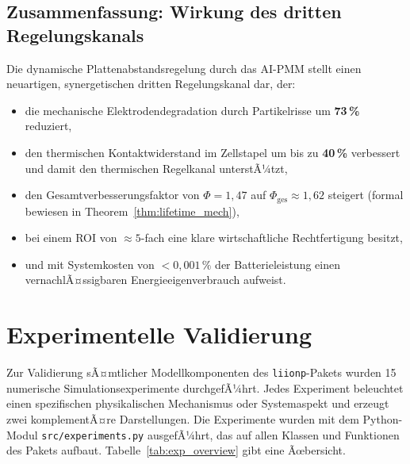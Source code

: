 ﻿\documentclass[12pt,a4paper]{article}
\begin{document}
\subsection{Zusammenfassung: Wirkung des dritten Regelungskanals}

Die dynamische Plattenabstandsregelung durch das AI-PMM stellt einen
neuartigen, synergetischen dritten Regelungskanal dar, der:

\begin{itemize}[leftmargin=*]
	\item die mechanische Elektrodendegradation durch Partikelrisse um
	\textbf{73\,\%} reduziert,
	\item den thermischen Kontaktwiderstand im Zellstapel um bis zu
	\textbf{40\,\%} verbessert und damit den thermischen Regelkanal unterstÃ¼tzt,
	\item den Gesamtverbesserungsfaktor von $\Phi = 1{,}47$ auf
	$\Phi_\mathrm{ges} \approx 1{,}62$ steigert (formal bewiesen in
	Theorem~\ref{thm:lifetime_mech}),
	\item bei einem ROI von $\approx 5$-fach eine klare wirtschaftliche
	Rechtfertigung besitzt,
	\item und mit Systemkosten von $< 0{,}001\,\%$ der Batterieleistung
	einen vernachlÃ¤ssigbaren Energieeigenverbrauch aufweist.
\end{itemize}

	\section{Experimentelle Validierung}
	\label{sec:validierung}

	Zur Validierung sÃ¤mtlicher Modellkomponenten des \texttt{liionp}-Pakets wurden
	15 numerische Simulationsexperimente durchgefÃ¼hrt. Jedes Experiment beleuchtet
	einen spezifischen physikalischen Mechanismus oder Systemaspekt und erzeugt
	zwei komplementÃ¤re Darstellungen. Die Experimente wurden mit dem Python-Modul
	\texttt{src/experiments.py} ausgefÃ¼hrt, das auf allen Klassen und Funktionen
	des Pakets aufbaut. Tabelle~\ref{tab:exp_overview} gibt eine Ãœbersicht.
\end{document}
